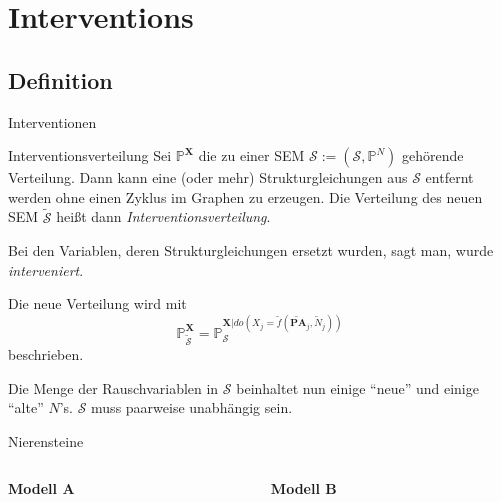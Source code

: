 \section{Interventions}
\subsection{Definition}
\begin{frame}{Interventionen}
    \begin{block}{Interventionsverteilung}
        Sei $\mathbb{P}^\mathbf{X}$ die zu einer SEM
        $\mathcal{S} := (\mathcal{S}, \mathbb{P}^N)$ gehörende Verteilung. Dann
        kann eine (oder mehr) Strukturgleichungen aus $\mathcal{S}$ entfernt
        werden ohne einen Zyklus im Graphen zu erzeugen. Die Verteilung des
        neuen SEM $\tilde{\mathcal{S}}$ heißt dann
        \textit{Interventionsverteilung}.

        Bei den Variablen, deren Strukturgleichungen ersetzt wurden, sagt man,
        wurde \textit{interveniert}.

        Die neue Verteilung wird mit
        \[\mathbb{P}_{\tilde{\mathcal{S}}}^{\mathbf{X}} = \mathbb{P}_{\mathcal{S}}^{\mathbf{X}| do(X_j=\tilde{f}(\tilde{\mathbf{PA}}_j, \tilde{N}_j))}\]
        beschrieben.

        Die Menge der Rauschvariablen in $\mathcal{S}$ beinhaltet nun einige
        \enquote{neue} und einige \enquote{alte} $N$'s. $\mathcal{S}$ muss
        paarweise unabhängig sein.
    \end{block}
\end{frame}

\begin{frame}{Nierensteine}
\begin{columns}
    \begin{column}{0.45\textwidth}
        \begin{center}\textbf{Modell A}\end{center}
    \end{column}
    \begin{column}{0.45\textwidth}
        \begin{center}\textbf{Modell B}\end{center}
    \end{column}
\end{columns}
\end{frame}
